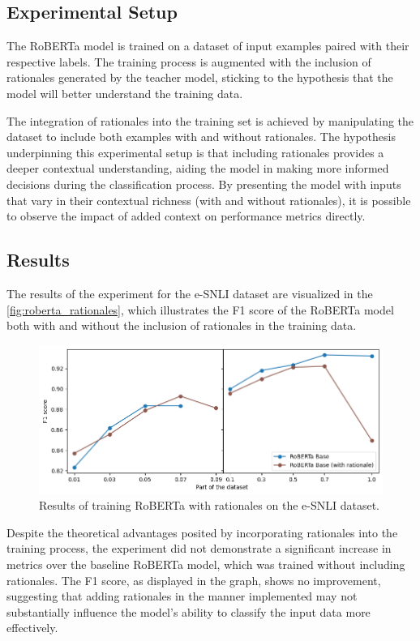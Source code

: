 \subsection*{Experimental Setup}

The RoBERTa model is trained on a dataset of input examples paired with their respective labels. The training process is augmented with the inclusion of rationales generated by the teacher model, sticking to the hypothesis that the model will better understand the training data.

The integration of rationales into the training set is achieved by manipulating the dataset to include both examples with and without rationales. The hypothesis underpinning this experimental setup is that including rationales provides a deeper contextual understanding, aiding the model in making more informed decisions during the classification process. By presenting the model with inputs that vary in their contextual richness (with and without rationales), it is possible to observe the impact of added context on performance metrics directly.

\subsection*{Results}

The results of the experiment for the e-SNLI dataset are visualized in the \autoref{fig:roberta_rationales}, which illustrates the F1 score of the RoBERTa model both with and without the inclusion of rationales in the training data.

\begin{figure}[hbt]
    \centering
    \includegraphics[width=\linewidth]{figs/roberta_rat.png}
    \caption{Results of training RoBERTa with rationales on the e-SNLI dataset.}
    \label{fig:roberta_rationales}
\end{figure}

Despite the theoretical advantages posited by incorporating rationales into the training process, the experiment did not demonstrate a significant increase in metrics over the baseline RoBERTa model, which was trained without including rationales. The F1 score, as displayed in the graph, shows no improvement, suggesting that adding rationales in the manner implemented may not substantially influence the model's ability to classify the input data more effectively.

